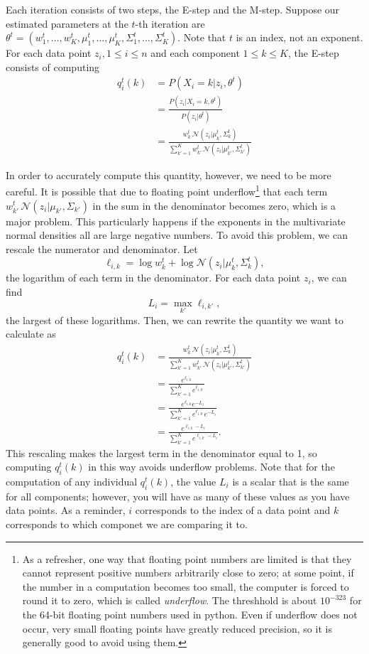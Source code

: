 Each iteration consists of two steps, the E-step and the M-step.
Suppose our estimated parameters at the \(t\)-th iteration are \(\theta^t=\left(w_1^t,\ldots,w_K^t, \mu_1^t,\ldots,\mu_K^t,\Sigma_1^t,\ldots,\Sigma_K^t\right)\).
Note that \(t\) is an index, not an exponent.
For each data point \(z_i, 1\leq i \leq n\) and each component \(1\leq k\leq K\), the E-step consists of computing
\begin{align*}
q_i^t(k) &=
P(X_i=k | z_i, \theta^t)
\\
&=
\frac{P(z_i|X_i=k,\theta^t)}{P(z_i|\theta^t)}
\\
&= 
\frac{
w_k^t \,\mathcal{N}(z_i| \mu_k^t,\Sigma_k^t)
}{
\sum_{k'=1}^K
w_{k'}^t \,\mathcal{N}(z_i| \mu_{k'}^t,\Sigma_{k'}^t)
}
\end{align*}

In order to accurately compute this quantity, however, we need to be more careful.
It is possible that due to floating point underflow\footnote{As a refresher, one way that floating point numbers are limited is that they cannot represent positive numbers arbitrarily close to zero; at some point, if the number in a computation becomes too small, the computer is forced to round it to zero, which is called \emph{underflow}. The threshhold is about \(10^{-323}\) for the 64-bit floating point numbers used in python. Even if underflow does not occur, very small floating points have greatly reduced precision, so it is generally good to avoid using them.} that each term 
\(
w_{k'}^t \,\mathcal{N}(z_i| \mu_{k'},\Sigma_{k'})
\)
in the sum in the denominator becomes zero, which is a major problem.
This particularly happens if the exponents in the multivariate normal densities all are large negative numbers.
To avoid this problem, we can rescale the numerator and denominator.
Let 
\[
\ell_{i,k} = \log w_{k}^t +\log\mathcal{N}(z_i| \mu_{k}^t,\Sigma_{k}^t),\]
the logarithm of each term in the denominator.
For each data point \(z_i\), we can find
\[
L_i
=\max_{k'} \ell_{i,{k'}},
\]
the largest of these logarithms.
Then, we can rewrite the quantity we want to calculate as
\begin{align*}
q_i^t(k) &=
\frac{
w_k^t \,\mathcal{N}(z_i| \mu_k^t,\Sigma_k^t)
}{
\sum_{k'=1}^K
w_{k'}^t \,\mathcal{N}(z_i| \mu_{k'}^t,\Sigma_{k'}^t)
}
\\
&=
\frac{
e^{\ell_{i,k}}
}{
\sum_{k'=1}^K
e^{\ell_{i,k'}}
}
\\
&=
\frac{
e^{\ell_{i,k}}e^{-L_i}
}{
\sum_{k'=1}^K
e^{\ell_{i,k'}}e^{-L_i}
}
\\
&=
\frac{
e^{\ell_{i,k}-L_i}
}{
\sum_{k'=1}^K
e^{\ell_{i,k'}-L_i}
}.
\end{align*}
This rescaling makes the largest term in the denominator equal to 1, so computing \(q_i^t(k)\) in this way avoids underflow problems.
Note that for the computation of any individual \(q_i^t(k)\), the value \(L_i\) is a scalar that is the same for all components; however, you will have as many of these values as you have data points.
As a reminder, \(i\) corresponds to the index of a data point and \(k\) corresponds to which componet we are comparing it to.


